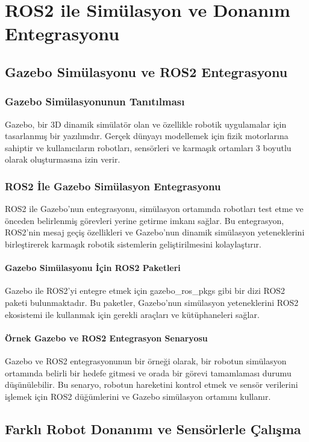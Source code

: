 \chapter{ROS2 ile Simülasyon ve Donanım Entegrasyonu}

\section{Gazebo Simülasyonu ve ROS2 Entegrasyonu}
\subsection{Gazebo Simülasyonunun Tanıtılması}
Gazebo, bir 3D dinamik simülatör olan ve özellikle robotik uygulamalar için tasarlanmış bir yazılımdır. Gerçek dünyayı modellemek için fizik motorlarına sahiptir ve kullanıcıların robotları, sensörleri ve karmaşık ortamları 3 boyutlu olarak oluşturmasına izin verir.

\subsection{ROS2 İle Gazebo Simülasyon Entegrasyonu}
ROS2 ile Gazebo'nun entegrasyonu, simülasyon ortamında robotları test etme ve önceden belirlenmiş görevleri yerine getirme imkanı sağlar. Bu entegrasyon, ROS2'nin mesaj geçiş özellikleri ve Gazebo'nun dinamik simülasyon yeteneklerini birleştirerek karmaşık robotik sistemlerin geliştirilmesini kolaylaştırır.

\subsubsection{Gazebo Simülasyonu İçin ROS2 Paketleri}
Gazebo ile ROS2'yi entegre etmek için gazebo\_ros\_pkgs gibi bir dizi ROS2 paketi bulunmaktadır. Bu paketler, Gazebo'nun simülasyon yeteneklerini ROS2 ekosistemi ile kullanmak için gerekli araçları ve kütüphaneleri sağlar.

\subsubsection{Örnek Gazebo ve ROS2 Entegrasyon Senaryosu}
Gazebo ve ROS2 entegrasyonunun bir örneği olarak, bir robotun simülasyon ortamında belirli bir hedefe gitmesi ve orada bir görevi tamamlaması durumu düşünülebilir. Bu senaryo, robotun hareketini kontrol etmek ve sensör verilerini işlemek için ROS2 düğümlerini ve Gazebo simülasyon ortamını kullanır.

\section{Farklı Robot Donanımı ve Sensörlerle Çalışma}

